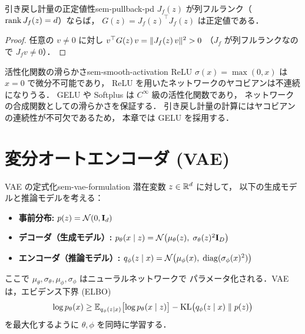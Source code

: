 \begin{proposition}{引き戻し計量の正定値性}{sem-pullback-pd}
  $J_f(z)$ が列フルランク（$\operatorname{rank} J_f(z) = d$）ならば，
  $G(z) = J_f(z)^\top J_f(z)$ は正定値である．
\end{proposition}
\begin{proof}
  任意の $v \ne 0$ に対し $v^\top G(z)\, v = \lVert J_f(z)\, v \rVert^2 > 0$
  （$J_f$ が列フルランクなので $J_f v \ne 0$）．
\end{proof}

\begin{remark}{活性化関数の滑らかさ}{sem-smooth-activation}
  ReLU $\sigma(x) = \max(0, x)$ は $x = 0$ で微分不可能であり，
  ReLU を用いたネットワークのヤコビアンは不連続になりうる．
  GELU や Softplus は $C^\infty$ 級の活性化関数であり，
  ネットワークの合成関数としての滑らかさを保証する．
  引き戻し計量の計算にはヤコビアンの連続性が不可欠であるため，
  本章では GELU を採用する．
\end{remark}

\section{変分オートエンコーダ (VAE)}
\label{sec:sem-vae-review}

\begin{definition}{VAE の定式化}{sem-vae-formulation}
  潜在変数 $z \in \mathbb{R}^d$ に対して，
  以下の生成モデルと推論モデルを考える：
  \begin{itemize}
    \item \textbf{事前分布:} $p(z) = \mathcal{N}(0, \mathbf{I}_d)$
    \item \textbf{デコーダ（生成モデル）:}
      $p_\theta(x \mid z) = \mathcal{N}\bigl(\mu_\theta(z),\; \sigma_\theta(z)^2 \mathbf{I}_D\bigr)$
    \item \textbf{エンコーダ（推論モデル）:}
      $q_\phi(z \mid x) = \mathcal{N}\bigl(\mu_\phi(x),\; \operatorname{diag}(\sigma_\phi(x)^2)\bigr)$
  \end{itemize}
  ここで $\mu_\theta, \sigma_\theta, \mu_\phi, \sigma_\phi$ はニューラルネットワークで
  パラメータ化される．VAE は，エビデンス下界 (ELBO)
  \begin{equation}
    \log p_\theta(x)
    \ge \mathbb{E}_{q_\phi(z|x)}\bigl[\log p_\theta(x \mid z)\bigr]
       - \operatorname{KL}\bigl(q_\phi(z \mid x) \;\|\; p(z)\bigr)
    \label{eq:elbo}
  \end{equation}
  を最大化するように $\theta, \phi$ を同時に学習する．
\end{definition}

